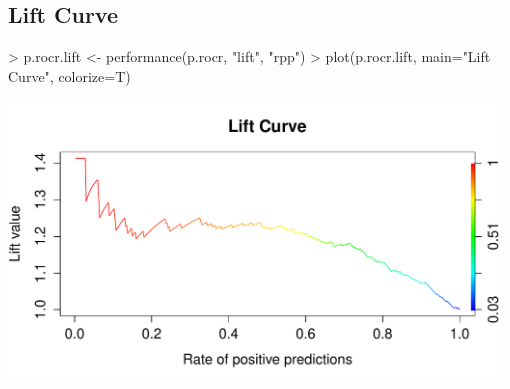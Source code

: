 \documentclass{article}
\begin{document}
\subsection*{Lift Curve}
\begin{Schunk}
\begin{Sinput}
> p.rocr.lift <- performance(p.rocr, "lift", "rpp")
> plot(p.rocr.lift, main="Lift Curve", colorize=T)
\end{Sinput}
\end{Schunk}
\includegraphics[width=0.98\textwidth]{LiftCurve.pdf}
\end{document}
